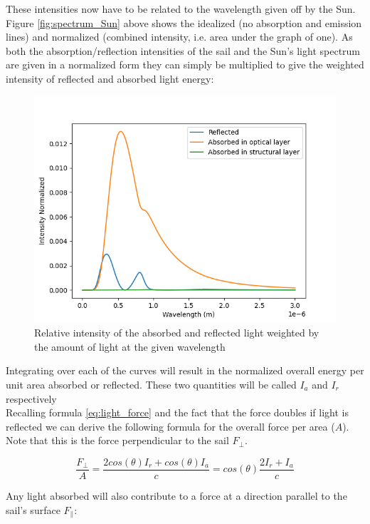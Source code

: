 \documentclass[14pt]{article}
\begin{document}
These intensities now have to be related to the wavelength given off by the Sun. Figure \ref{fig:spectrum_Sun} above
shows the idealized (no absorption and emission lines) and normalized (combined intensity, i.e. area under the graph of one). As both
the absorption/reflection intensities of the sail and the Sun's light spectrum are given in a normalized form
they can simply be multiplied to give the weighted intensity of reflected and absorbed light energy:

\begin{figure}[H]
  \centering
  \includegraphics[width=14cm]{./python/output/reflection_and_absorption_aluminum_sail_weighted.png}
  \caption{Relative intensity of the absorbed and reflected light weighted by the amount of light at the given wavelength}
  \label{fig:aluminum_sail_weighted}
\end{figure}

Integrating over each of the curves will result in the normalized overall energy per unit area absorbed or reflected.
These two quantities will be called $I_{a}$ and $I_{r}$ respectively\\
Recalling formula \ref{eq:light_force} and the fact that the force doubles if light is reflected we can derive the following 
formula for the overall force per area ($A$). Note that this is the force 
perpendicular to the sail $F_{\perp}$. 

$$
  \frac{F_{\perp}}{A} = \frac{ 2 cos(\theta) I_{r} + cos(\theta) I_{a} }{c}
  = cos(\theta) \frac{ 2  I_{r} + I_{a} }{c}
$$

Any light absorbed will also contribute to a force at a direction parallel to the sail's surface $F_{\parallel}$:
\end{document}

